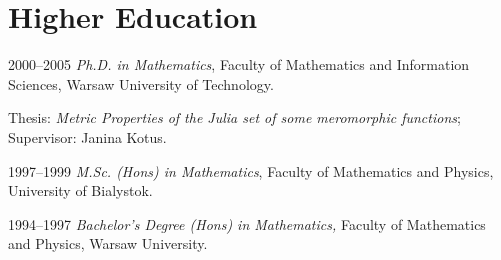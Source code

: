 \documentclass{article}
\begin{document}
\section{Higher Education}
\begin{CV}
\item[2000--2005] \emph{Ph.D. in Mathematics}, Faculty of Mathematics and
  Information Sciences, Warsaw University of Technology.

  Thesis: \emph{Metric Properties of the Julia set of some meromorphic
    functions}; Supervisor: Janina Kotus.

\item[1997--1999] \emph{M.Sc. (Hons) in Mathematics}, Faculty of Mathematics
  and Physics, University of Bialystok.

\item[1994--1997] {\em Bachelor's Degree (Hons) in Mathematics,} Faculty of
  Mathematics and Physics, Warsaw University.

\end{CV}
\end{document}
